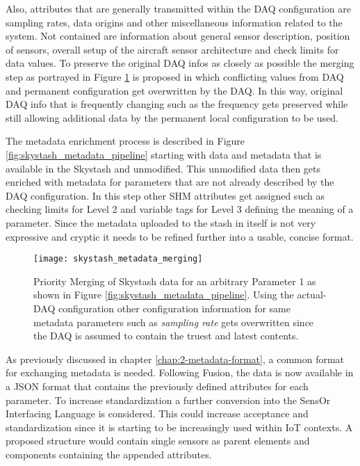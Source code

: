 Also, attributes that are generally transmitted within the DAQ configuration are sampling rates, data origins and other miscellaneous information related to the system. Not contained are information about general sensor description, position of sensors, overall setup of the aircraft sensor architecture and check limits for data values. To preserve the original DAQ infos as closely as possible the merging step as portrayed in Figure \ref{fig:skystash_metadata_merging} is proposed in which conflicting values from DAQ and permanent configuration get overwritten by the DAQ. In this way, original DAQ info that is frequently changing such as the frequency gets preserved while still allowing additional data by the permanent local configuration to be used.

The metadata enrichment process is described in Figure \ref{fig:skystash_metadata_pipeline} starting with data and metadata that is available in the Skystash and unmodified. This unmodified data then gets enriched with metadata for parameters that are not already described by the DAQ configuration. In this step other SHM attributes get assigned such as checking limits for Level 2 and variable tags for Level 3 defining the meaning of a parameter. Since the metadata uploaded to the stash in itself is not very expressive and cryptic it needs to be refined further into a usable, concise format.
\begin{figure}
    \centering
    \texttt{[image: skystash\_metadata\_merging]}
    \caption[SHM Configuration Priority Merging]{Priority Merging of Skystash data for an arbitrary Parameter 1 as shown in Figure \ref{fig:skystash_metadata_pipeline}. Using the actual-DAQ configuration other configuration information for same metadata parameters such as \textit{sampling rate} gets overwritten since the DAQ is assumed to contain the truest and latest contents.}
    \label{fig:skystash_metadata_merging}
\end{figure}


As previously discussed in chapter \ref{chap:2-metadata-format}, a common format for exchanging metadata is needed. Following Fusion, the data is now available in a JSON format that contains the previously defined attributes for each parameter. To increase standardization a further conversion into the SensOr Interfacing Language is considered. This could increase acceptance and standardization since it is starting to be increasingly used within IoT contexts. A proposed structure would contain single sensors as parent elements and components containing the appended attributes. \cite{behrens_domain-specific_2021}

